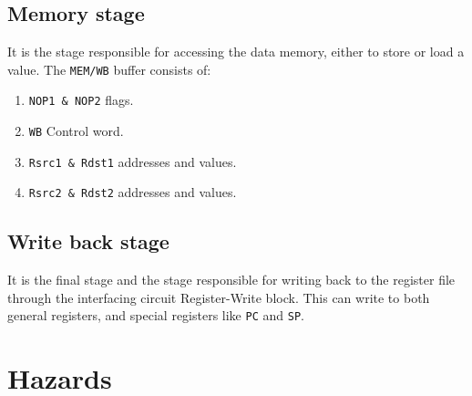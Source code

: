 \documentclass[12pt]{article}
\begin{document}
\subsection{Memory stage}
It is the stage responsible for accessing the data memory, either to store or load a value. The \texttt{MEM/WB} buffer consists of: 
\begin{enumerate}
	\item \texttt{NOP1 \& NOP2} flags.
	\item \texttt{WB} Control word.  
	\item \texttt{Rsrc1 \& Rdst1} addresses and values.
	\item \texttt{Rsrc2 \& Rdst2} addresses and values.
\end{enumerate}
\subsection{Write back stage}
It is the final stage and the stage responsible for writing back to the register file through the interfacing circuit Register-Write block. This can write to both general registers, and special registers like \texttt{PC} and \texttt{SP}.

\section{Hazards}
\end{document}
